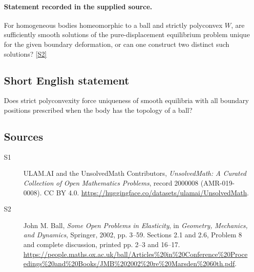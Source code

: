 \documentclass[11pt]{book}
\newcommand{\sref}[2]{\hyperlink{source:#1:#2}{[S#2]}}
\begin{document}
\paragraph{Statement recorded in the supplied source.}
For homogeneous bodies homeomorphic to a ball and strictly polyconvex $W$, are sufficiently smooth solutions of the pure-displacement equilibrium problem unique for the given boundary deformation, or can one construct two distinct such solutions? \sref{2000008}{2}
\subsection{Short English statement}
Does strict polyconvexity force uniqueness of smooth equilibria with all boundary positions prescribed when the body has the topology of a ball?
\subsection{Sources}
\begin{description}
\item[\hypertarget{source:2000008:1}{S1}] ULAM.AI and the UnsolvedMath Contributors, \emph{UnsolvedMath: A Curated Collection of Open Mathematics Problems}, record 2000008 (AMR-019-0008). CC BY 4.0. \url{https://huggingface.co/datasets/ulamai/UnsolvedMath}.
\item[\hypertarget{source:2000008:2}{S2}] John M. Ball, \emph{Some Open Problems in Elasticity}, in \emph{Geometry, Mechanics, and Dynamics}, Springer, 2002, pp. 3--59. Sections 2.1 and 2.6, Problem 8 and complete discussion, printed pp. 2--3 and 16--17. \url{https://people.maths.ox.ac.uk/ball/Articles%20in%20Conference%20Proceedings%20and%20Books/JMB%202002%20re%20Marsden%2060th.pdf}.
\end{description}
\label{end:2000008}
\end{document}
